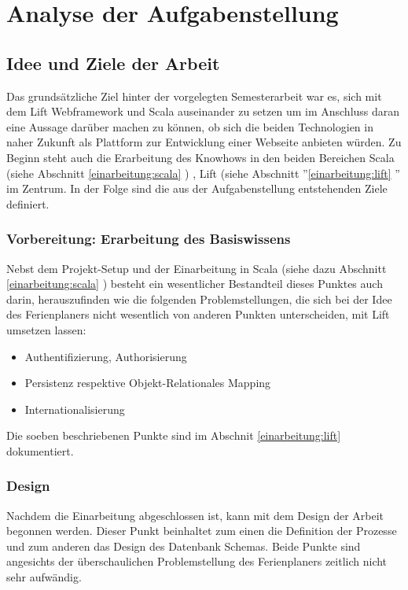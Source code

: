\chapter{Analyse der Aufgabenstellung}
\section{Idee und Ziele der Arbeit}
Das grunds\"atzliche Ziel hinter der vorgelegten Semesterarbeit war es, sich mit dem Lift Webframework und Scala auseinander zu setzen um im Anschluss daran eine Aussage dar\"uber machen zu können, ob sich die beiden Technologien in naher Zukunft als Plattform zur Entwicklung einer Webseite anbieten w\"urden. Zu Beginn steht auch die Erarbeitung des Knowhows in den beiden Bereichen Scala (siehe Abschnitt \ref{einarbeitung:scala} ) , Lift (siehe Abschnitt ''\ref{einarbeitung:lift} '' im Zentrum. In der Folge sind die aus der Aufgabenstellung entstehenden Ziele definiert.

\subsection{Vorbereitung: Erarbeitung des Basiswissens}
Nebst dem Projekt-Setup und der Einarbeitung in Scala (siehe dazu Abschnitt \ref{einarbeitung:scala} )  besteht ein wesentlicher Bestandteil dieses Punktes auch darin, herauszufinden wie die folgenden Problemstellungen, die sich bei der Idee des Ferienplaners nicht wesentlich von anderen Punkten unterscheiden, mit Lift umsetzen lassen:
	\begin{itemize}
		\item Authentifizierung, Authorisierung
		\item Persistenz respektive Objekt-Relationales Mapping
		\item Internationalisierung
	\end{itemize}
Die soeben beschriebenen Punkte sind im Abschnit \ref{einarbeitung:lift}  dokumentiert.

\subsection{Design}
Nachdem die Einarbeitung abgeschlossen ist, kann mit dem Design der Arbeit begonnen werden. Dieser Punkt beinhaltet zum einen die Definition der Prozesse und zum anderen das Design des Datenbank Schemas. Beide Punkte sind angesichts der \"uberschaulichen Problemstellung des Ferienplaners zeitlich nicht sehr aufw\"andig.

